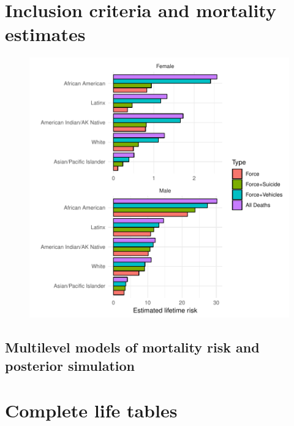 \documentclass{article}
\begin{document}
\section{Inclusion criteria and mortality estimates}

\begin{figure}
	\includegraphics[width=\linewidth]{vis/death_type_c.pdf}
	\label{fig:death_type}
\end{figure}

\subsection{Multilevel models of mortality risk and posterior simulation}

\section{Complete life tables}
\end{document}
